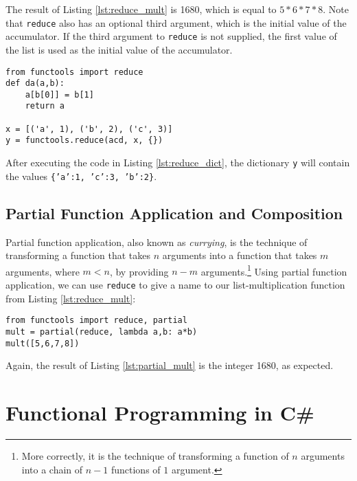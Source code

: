 \documentclass{article}\usepackage{beamerarticle}
\begin{document}
\noindent The result of Listing \ref{lst:reduce_mult} is 1680, which is equal to $5 * 6 * 7 * 8$. Note that \texttt{reduce} also has an optional third argument, which is the initial value of the accumulator. If the third argument to \texttt{reduce} is not supplied, the first value of the list is used as the initial value of the accumulator.

\begin{frame}[fragile]
\begin{lstlisting}[style=python,caption={Convert to Dictionary},label={lst:reduce_dict}]
from functools import reduce
def da(a,b):
    a[b[0]] = b[1]
    return a

x = [('a', 1), ('b', 2), ('c', 3)]
y = functools.reduce(acd, x, {})
\end{lstlisting}
\end{frame}

\noindent After executing the code in Listing \ref{lst:reduce_dict}, the dictionary \texttt{y} will contain the values \texttt{\{'a':1, 'c':3, 'b':2\}}.

\subsection{Partial Function Application and Composition}
Partial function application, also known as \textit{currying}, is the technique of transforming a function that takes $n$ arguments into a function that takes $m$ arguments, where $m < n$, by providing $n-m$ arguments.\footnote{More correctly, it is the technique of transforming a function of $n$ arguments into a chain of $n-1$ functions of $1$ argument.} Using partial function application, we can use \texttt{reduce} to give a name to our list-multiplication function from Listing \ref{lst:reduce_mult}:

\begin{frame}
\begin{lstlisting}[style=python,caption={List Multiplication},label={lst:partial_mult}]
from functools import reduce, partial
mult = partial(reduce, lambda a,b: a*b)
mult([5,6,7,8])
\end{lstlisting}
\end{frame}

\noindent Again, the result of Listing \ref{lst:partial_mult} is the integer 1680, as expected.


\section{Functional Programming in C\#}
\begin{frame}
\end{frame}
\end{document}
